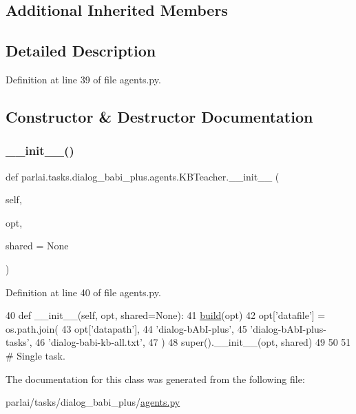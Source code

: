 \subsection*{Additional Inherited Members}


\subsection{Detailed Description}


Definition at line 39 of file agents.\+py.



\subsection{Constructor \& Destructor Documentation}
\mbox{\label{classparlai_1_1tasks_1_1dialog__babi__plus_1_1agents_1_1KBTeacher_aa291d9b9f60df40b085271f0dd7d3b0e}} 
\subsubsection{\texorpdfstring{\+\_\+\+\_\+init\+\_\+\+\_\+()}{\_\_init\_\_()}}
{\footnotesize\ttfamily def parlai.\+tasks.\+dialog\+\_\+babi\+\_\+plus.\+agents.\+K\+B\+Teacher.\+\_\+\+\_\+init\+\_\+\+\_\+ (\begin{DoxyParamCaption}\item[{}]{self,  }\item[{}]{opt,  }\item[{}]{shared = {\ttfamily None} }\end{DoxyParamCaption})}



Definition at line 40 of file agents.\+py.


\begin{DoxyCode}
40     \textcolor{keyword}{def }\_\_init\_\_(self, opt, shared=None):
41         \hyperlink{namespaceparlai_1_1mturk_1_1tasks_1_1talkthewalk_1_1download_a8c0fbb9b6dfe127cb8c1bd6e7c4e33fd}{build}(opt)
42         opt[\textcolor{stringliteral}{'datafile'}] = os.path.join(
43             opt[\textcolor{stringliteral}{'datapath'}],
44             \textcolor{stringliteral}{'dialog-bAbI-plus'},
45             \textcolor{stringliteral}{'dialog-bAbI-plus-tasks'},
46             \textcolor{stringliteral}{'dialog-babi-kb-all.txt'},
47         )
48         super().\_\_init\_\_(opt, shared)
49 
50 
51 \textcolor{comment}{# Single task.}
\end{DoxyCode}


The documentation for this class was generated from the following file\+:\begin{DoxyCompactItemize}
\item 
parlai/tasks/dialog\+\_\+babi\+\_\+plus/\hyperlink{parlai_2tasks_2dialog__babi__plus_2agents_8py}{agents.\+py}\end{DoxyCompactItemize}
